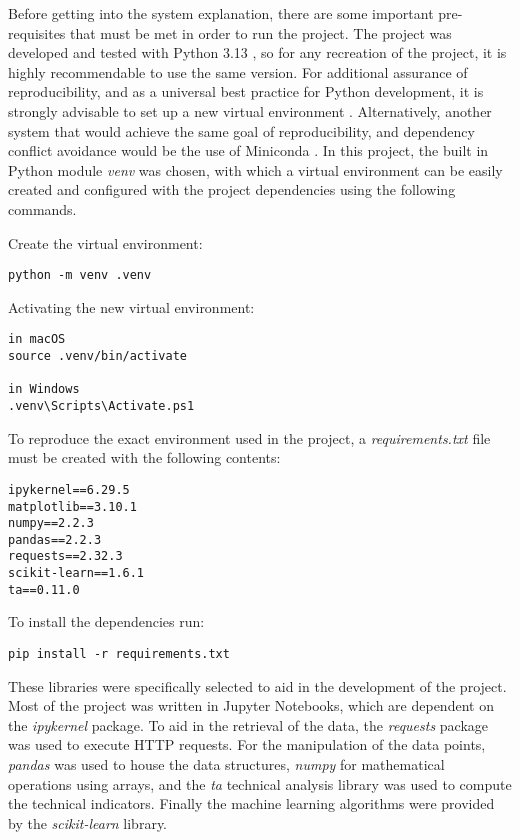 \documentclass[12pt]{report} %
\begin{document}
Before getting into the system explanation, there are some important pre-requisites that must be met in order to run the project. The project was developed and tested with Python 3.13 \cite{python3.13}, so for any recreation of the project, it is highly recommendable to use the same version. For additional assurance of reproducibility, and as a universal best practice for Python development, it is strongly advisable to set up a new virtual environment \cite{python_venv}. Alternatively, another system that would achieve the same goal of reproducibility, and dependency conflict avoidance would be the use of Miniconda \cite{conda}. In this project, the built in Python module \textit{venv} was chosen, with which a virtual environment can be easily created and configured with the project dependencies using the following commands.

\noindent Create the virtual environment:
\begin{verbatim}
python -m venv .venv
\end{verbatim}

\noindent Activating the new virtual environment:
\begin{verbatim}
in macOS
source .venv/bin/activate

in Windows
.venv\Scripts\Activate.ps1
\end{verbatim}

\noindent To reproduce the exact environment used in the project, a \textit{requirements.txt} file must be created with the following contents:
\begin{verbatim}
ipykernel==6.29.5
matplotlib==3.10.1
numpy==2.2.3
pandas==2.2.3
requests==2.32.3
scikit-learn==1.6.1
ta==0.11.0
\end{verbatim}

\noindent To install the dependencies run:
\begin{verbatim}
pip install -r requirements.txt 
\end{verbatim}

These libraries were specifically selected to aid in the development of the project. Most of the project was written in Jupyter Notebooks, which are dependent on the \textit{ipykernel} package. To aid in the retrieval of the data, the \textit{requests} package was used to execute HTTP requests. For the manipulation of the data points, \textit{pandas} was used to house the data structures, \textit{numpy} for mathematical operations using arrays, and the \textit{ta} technical analysis library was used to compute the technical indicators. Finally the machine learning algorithms were provided by the \textit{scikit-learn} library.
\end{document}
